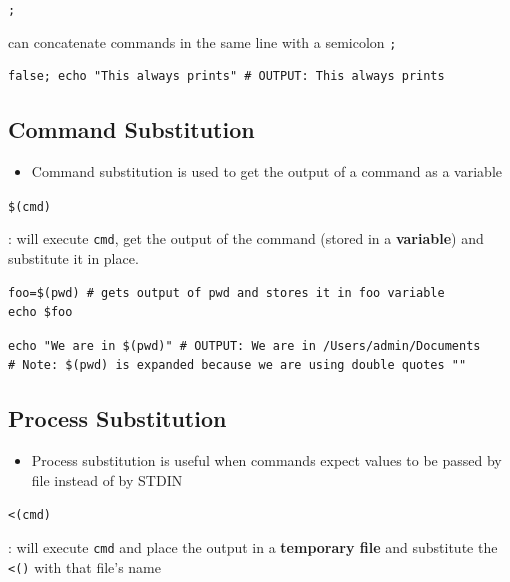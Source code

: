 \documentclass[letterpaper,12pt]{article}
\newcommand*{\lstitem}[1]{
  \setbox0\hbox{\lstinline{#1}}
  \item[\usebox0]
}
\begin{document}
\begin{description}
 \lstitem{;} can concatenate commands in the same line with a semicolon \lstinline{;}
\end{description}

\begin{lstlisting}
false; echo "This always prints" # OUTPUT: This always prints
\end{lstlisting}

\subsection{Command Substitution}

\begin{itemize}
 \item Command substitution is used to get the output of a command as a variable
\end{itemize}

\begin{description}
 \lstitem{$(cmd)}: will execute \lstinline{cmd}, get the output of the command (stored in a \textbf{variable}) and substitute it in place.
\end{description}

\begin{lstlisting}
foo=$(pwd) # gets output of pwd and stores it in foo variable
echo $foo
\end{lstlisting}

\begin{lstlisting}
echo "We are in $(pwd)" # OUTPUT: We are in /Users/admin/Documents
# Note: $(pwd) is expanded because we are using double quotes ""
\end{lstlisting}

\subsection{Process Substitution}

\begin{itemize}
 \item Process substitution is useful when commands expect values to be passed by file instead of by STDIN
\end{itemize}

\begin{description}
 \lstitem{<(cmd)}: will execute \lstinline{cmd} and place the output in a \textbf{temporary file} and substitute the \lstinline{<()} with that file’s name
\end{description}
\end{document}
